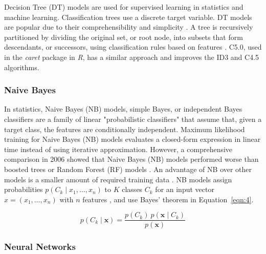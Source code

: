 \let\LaTeXcline\cline\documentclass[sn-mathphys-num]{sn-jnl}\let\cline\LaTeXcline
\begin{document}
Decision Tree (DT) models are used for supervised learning in statistics and machine learning. Classification trees use a discrete target variable. DT models are popular due to their comprehensibility and simplicity \cite{Wu2008}. A tree is recursively partitioned by dividing the original set, or root node, into subsets that form descendants, or successors, using classification rules based on features \cite{ShalevShwartz2014}. C5.0, used in the \textit{caret} package in \textit{R}, has a similar approach and improves the ID3 and C4.5 algorithms.

\subsubsection{Naive Bayes}

In statistics, Naive Bayes (NB) models, simple Bayes, or independent Bayes \cite{Hand2001} classifiers are a family of linear "probabilistic classifiers" that assume that, given a target class, the features are conditionally independent. Maximum likelihood training for Naive Bayes (NB) models evaluates a closed-form expression \cite{Russell1999} in linear time instead of using iterative approximation. However, a comprehensive comparison in 2006 showed that Naive Bayes (NB) models performed worse than boosted trees or Random Forest (RF) models \cite{Caruana2006}. An advantage of NB over other models is a smaller amount of required training data \cite{John2013}. NB models assign probabilities $p(C_{k}\mid x_{1},\ldots, x_{n})$ to $K$ classes $C_{k}$ for an input vector $x = (x_{1},\ldots, x_{n})$ with $n$ features \cite{Murty2011}, and use Bayes' theorem in Equation~\ref{eqn:4}.

\begin{equation}
	p(C_{k}\mid \mathbf{x})={\frac{p(C_{k})\ p(\mathbf{x} \mid C_{k})}{p(\mathbf{x})}}
	\label{eqn:4}
\end{equation}

\subsubsection{Neural Networks}
\end{document}
